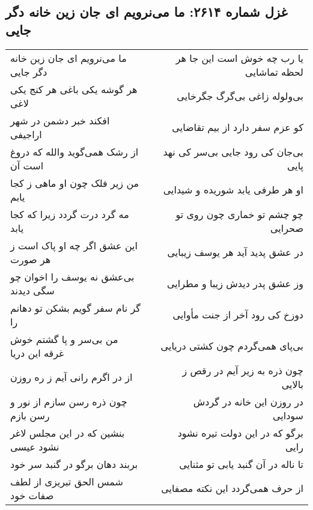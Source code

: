 \begin{center}
\section*{غزل شماره ۲۶۱۴: ما می‌نرویم ای جان زین خانه دگر جایی}
\label{sec:2614}
\begin{longtable}{l p{0.5cm} r}
ما می‌نرویم ای جان زین خانه دگر جایی
&&
یا رب چه خوش است این جا هر لحظه تماشایی
\\
هر گوشه یکی باغی هر کنج یکی لاغی
&&
بی‌ولوله زاغی بی‌گرگ جگرخایی
\\
افکند خبر دشمن در شهر اراجیفی
&&
کو عزم سفر دارد از بیم تقاضایی
\\
از رشک همی‌گوید والله که دروغ است آن
&&
بی‌جان کی رود جایی بی‌سر کی نهد پایی
\\
من زیر فلک چون او ماهی ز کجا یابم
&&
او هر طرفی یابد شوریده و شیدایی
\\
مه گرد درت گردد زیرا که کجا یابد
&&
چو چشم تو خماری چون روی تو صحرایی
\\
این عشق اگر چه او پاک است ز هر صورت
&&
در عشق پدید آید هر یوسف زیبایی
\\
بی‌عشق نه یوسف را اخوان چو سگی دیدند
&&
وز عشق پدر دیدش زیبا و مطرایی
\\
گر نام سفر گویم بشکن تو دهانم را
&&
دوزخ کی رود آخر از جنت مأوایی
\\
من بی‌سر و پا گشتم خوش غرقه این دریا
&&
بی‌پای همی‌گردم چون کشتی دریایی
\\
از در اگرم رانی آیم ز ره روزن
&&
چون ذره به زیر آیم در رقص ز بالایی
\\
چون ذره رسن سازم از نور و رسن بازم
&&
در روزن این خانه در گردش سودایی
\\
بنشین که در این مجلس لاغر نشود عیسی
&&
برگو که در این دولت تیره نشود رایی
\\
بربند دهان برگو در گنبد سر خود
&&
تا ناله در آن گنبد یابی تو مثنایی
\\
شمس الحق تبریزی از لطف صفات خود
&&
از حرف همی‌گردد این نکته مصفایی
\\
\end{longtable}
\end{center}
